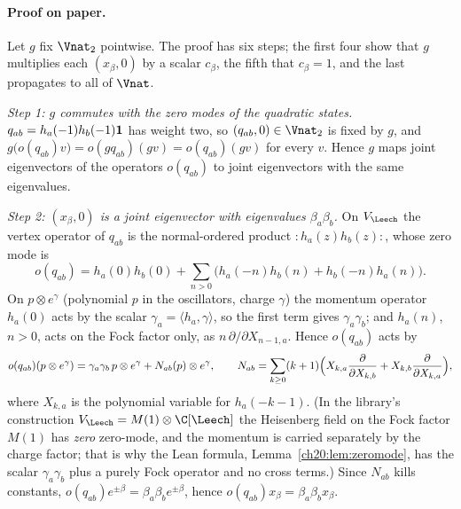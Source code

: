 \paragraph{Proof on paper.}  Let $g$ fix $\Vnat_2$ pointwise.  The proof has six steps; the first four show that
$g$ multiplies each $(x_\beta,0)$ by a scalar $c_\beta$, the fifth that $c_\beta=1$, and the last propagates to all of
$\Vnat$.

\emph{Step 1: $g$ commutes with the zero modes of the quadratic states.}  $q_{ab}=h_a(-1)h_b(-1)\mathbf 1$ has
weight two, so $(q_{ab},0)\in\Vnat_2$ is fixed by $g$, and
$g\bigl(o(q_{ab})v\bigr)=o(gq_{ab})(gv)=o(q_{ab})(gv)$ for every $v$.  Hence $g$ maps joint eigenvectors of the
operators $o(q_{ab})$ to joint eigenvectors with the same eigenvalues.

\emph{Step 2: $(x_\beta,0)$ is a joint eigenvector with eigenvalues $\beta_a\beta_b$.}  On $V_\Leech$ the vertex
operator of $q_{ab}$ is the normal-ordered product ${:}h_a(z)h_b(z){:}$, whose zero mode is
\begin{equation*}
  o(q_{ab})=h_a(0)h_b(0)+\sum_{n>0}\bigl(h_a(-n)h_b(n)+h_b(-n)h_a(n)\bigr).
\end{equation*}
On $p\otimes e^\gamma$ (polynomial $p$ in the oscillators, charge $\gamma$) the momentum operator $h_a(0)$ acts by the
scalar $\gamma_a=\langle h_a,\gamma\rangle$, so the first term gives $\gamma_a\gamma_b$; and $h_a(n)$, $n>0$, acts on the Fock
factor only, as $n\,\partial/\partial X_{n-1,a}$.  Hence $o(q_{ab})$ acts by
\begin{equation}\label{ch20:eq:zeromode}
  o(q_{ab})(p\otimes e^\gamma)=\gamma_a\gamma_b\,p\otimes e^\gamma+N_{ab}(p)\otimes e^\gamma,\qquad
  N_{ab}=\sum_{k\ge0}(k+1)\Bigl(X_{k,a}\frac{\partial}{\partial X_{k,b}}+X_{k,b}\frac{\partial}{\partial X_{k,a}}\Bigr),
\end{equation}
where $X_{k,a}$ is the polynomial variable for $h_a(-k-1)$.  (In the library's construction $V_\Leech=M(1)\otimes\C[\Leech]$
the Heisenberg field on the Fock factor $M(1)$ has \emph{zero} zero-mode, and the momentum is carried separately by the
charge factor; that is why the Lean formula, Lemma~\ref{ch20:lem:zeromode}, has the scalar $\gamma_a\gamma_b$ plus a purely
Fock operator and no cross terms.)  Since
$N_{ab}$ kills constants, $o(q_{ab})e^{\pm\beta}=\beta_a\beta_b e^{\pm\beta}$, hence $o(q_{ab})x_\beta=\beta_a\beta_bx_\beta$.

